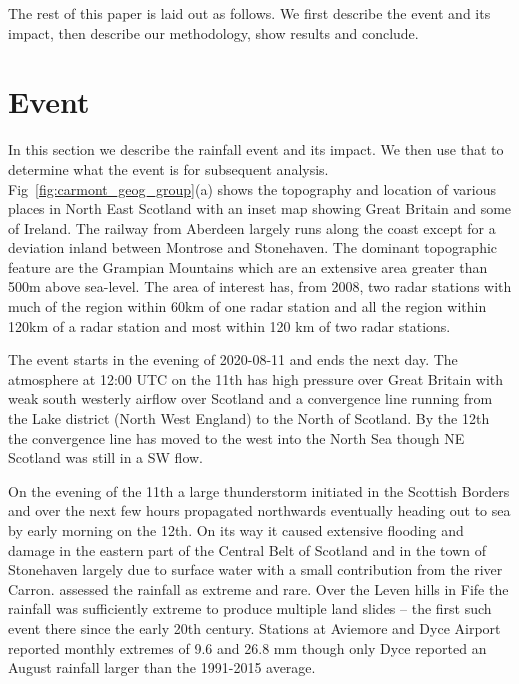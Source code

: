 \documentclass[11pt,a4paper]{article}
\begin{document}
The rest of this paper is laid out as follows. We first describe the event and its impact, then describe our methodology, show results and conclude. 


\section{Event}

In this section we describe the rainfall event and its impact. We then use that to determine what the event is for subsequent analysis. Fig~\ref{fig:carmont_geog_group}(a) shows the topography and location of various places in North East Scotland with an inset map showing Great Britain and some of Ireland. The railway from Aberdeen largely runs along the coast except for a deviation inland between Montrose and Stonehaven.  The dominant topographic feature are the Grampian Mountains which are an extensive area greater than 500m above sea-level. The area of interest has, from 2008, two radar stations with much of the region within 60km of one radar station and  all the region within 120km of a radar station and most within 120 km of two radar stations. 

  The event starts in the evening of 2020-08-11 and ends the next day. The atmosphere  at 12:00 UTC on the 11th has high pressure over Great Britain with weak south westerly airflow over Scotland and a convergence line running from the Lake district (North West England) to the North of Scotland\parencite{pritchard2020weather}. By the 12th the convergence line has moved to the west into the North Sea though NE Scotland was still in a SW flow. 

On  the evening of the 11th  a large thunderstorm initiated in the Scottish Borders and over the next few hours propagated northwards eventually heading out to sea by early morning on the 12th\parencite{Kendon2020thunderstrorms_report}. On its way it caused extensive flooding and damage in the eastern part of the Central Belt of Scotland\parencite{SEPA2020report_floods,kendon2021ukclimate} and in the town of Stonehaven largely due to surface water with a small contribution from the river Carron. \cite{SEPA2020report_floods} assessed the rainfall as  extreme and rare. Over the Leven hills in Fife the rainfall was sufficiently extreme to produce multiple land slides -- the first such event there since the early 20th century\parencite{Kirkbride2021}.  Stations at Aviemore and Dyce Airport\parencite{pritchard2020weather} reported monthly extremes of 9.6 and 26.8 mm though only Dyce reported an August rainfall larger than the 1991-2015 average. 
\end{document}
